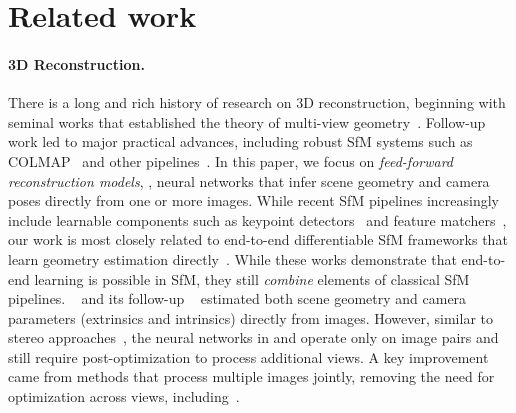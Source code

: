 \section{Related work}%
\label{sec:related}

\paragraph{3D Reconstruction.}

There is a long and rich history of research on 3D reconstruction, beginning with seminal works that established the theory of multi-view geometry~\cite{faugeras90motion, oliensis00a-critique, hartley04multiple, ozyesil17a-survey}.
Follow-up work led to major practical advances, including robust SfM systems such as COLMAP~\cite{schonberger16structure-from-motion} and other pipelines~\cite{snavely06photo, agarwal11building, frahm10building, liu24robust, dellaert12factor}.
In this paper, we focus on \textit{feed-forward reconstruction models}, \ie, neural networks that infer scene geometry and camera poses directly from one or more images.
While recent SfM pipelines increasingly include learnable components such as keypoint detectors~\cite{yi16lift:,daniel18superpoint:,dusmanu19d2-net:,tyszkiewicz20disk:} and feature matchers~\cite{sarlin20superglue:,chen21learning,shi22clustergnn:,lindenberger23lightglue:}, our work is most closely related to end-to-end differentiable SfM frameworks that learn geometry estimation directly~\cite{zhou17unsupervised, ummenhofer17demon:, tang19ba-net:, wei20deepsfm:, wang21deep, teed20deepv2d:, teed21droid-slam:, brachmann24scene, wang23posediffusion:, wang24vggsfm:}.
While these works demonstrate that end-to-end learning is possible in SfM, they still \emph{combine} elements of classical SfM pipelines.
\duster~\cite{wang24dust3r:} and its follow-up \master~\cite{duisterhof25mast3r-sfm:} estimated both scene geometry and camera parameters (extrinsics and intrinsics) directly from images.
However, similar to stereo approaches~\cite{niemeyer20differentiable, fu22geo-neus:, wei21nerfingmvs:, yariv20multiview, yao18mvsnet:, gu20cascade, ma22multiview, peng22rethinking, zhang23geomvsnet:}, the neural networks in \duster and \master operate only on image pairs and still require post-optimization to process additional views.
A key improvement came from methods that process multiple images jointly, removing the need for optimization across views, including~\cite{wang24spann3r:, wang25continuous, tang25mv-dust3r:, wu25point3r:, zhang25flare:, yang25fast3r:, elflein25light3r-sfm:}.
